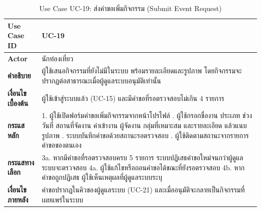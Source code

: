 \begin{table}[H]
\centering
\caption{Use Case UC-19: ส่งคำขอเพิ่มกิจกรรม (Submit Event Request)}
\label{tab:uc19}
\begin{tabular}{|p{3.2cm}|p{10cm}|}
\hline
\textbf{Use Case ID} & UC-19 \\ \hline
\textbf{Actor} & นักท่องเที่ยว \\ \hline
\textbf{คำอธิบาย} & ผู้ใช้เสนอกิจกรรมที่ยังไม่มีในระบบ พร้อมรายละเอียดและรูปภาพ โดยกิจกรรมจะปรากฏต่อสาธารณะเมื่อผู้ดูแลระบบอนุมัติเท่านั้น \\ \hline
\textbf{เงื่อนไขเบื้องต้น} & ผู้ใช้เข้าสู่ระบบแล้ว (UC-15) และมีคำขอที่รอตรวจสอบไม่เกิน 4 รายการ \\ \hline
\textbf{กระแสหลัก} & 1. ผู้ใช้เปิดฟอร์มคำขอเพิ่มกิจกรรมจากหน้าโปรไฟล์ \newline 2. ผู้ใช้กรอกชื่องาน ประเภท ช่วงวันที่ สถานที่จัดงาน ค่าเข้างาน ผู้จัดงาน กลุ่มที่เหมาะสม และรายละเอียด แล้วแนบรูปภาพ \newline 3. ระบบบันทึกคำขอด้วยสถานะรอตรวจสอบ \newline 4. ผู้ใช้ติดตามสถานะจากรายการคำขอของตนเอง \\ \hline
\textbf{กระแสทางเลือก} & 3a. หากมีคำขอที่รอตรวจสอบครบ 5 รายการ ระบบปฏิเสธคำขอใหม่จนกว่าผู้ดูแลระบบจะตรวจสอบ \newline 4a. ผู้ใช้แก้ไขหรือถอนคำขอได้ขณะที่ยังรอตรวจสอบ \newline 4b. หากคำขอถูกปฏิเสธ ผู้ใช้เห็นเหตุผลที่ผู้ดูแลระบบระบุ \\ \hline
\textbf{เงื่อนไขภายหลัง} & คำขอปรากฏในคิวของผู้ดูแลระบบ (UC-21) และเมื่ออนุมัติจะกลายเป็นกิจกรรมที่เผยแพร่ในระบบ \\
\hline
\end{tabular}
\end{table}

